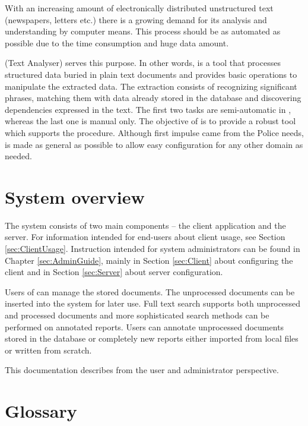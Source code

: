 
With an increasing amount of electronically distributed unstructured text
(newspapers, letters etc.) there is a growing demand for its analysis and
understanding by computer means. This process should be as automated as possible
due to the time consumption and huge data amount.

\textan{} (Text Analyser) serves this purpose. In other words, \textan{} is a
tool that processes structured data buried in plain text documents and provides
basic operations to manipulate the extracted data. The extraction consists of
recognizing significant phrases, matching them with data already stored in the
database and discovering dependencies expressed in the text. The first two tasks
are semi-automatic in \textan{}, whereas the last one is manual only. The
objective of \textan{} is to provide a robust tool which supports the procedure.
Although first impulse came from the Police needs, \textan{} is made as general as
possible to allow easy configuration for any other domain as needed.

\section{System overview}
The system consists of two main components -- the client application
and the server. For information intended for end-users about client usage, see
Section \ref{sec:ClientUsage}. Instruction intended for system
administrators can be found in Chapter \ref{sec:AdminGuide}, mainly in Section
\ref{sec:Client} about configuring the client and in Section \ref{sec:Server}
about server configuration.

Users of \textan{} can manage the stored documents. The unprocessed documents
can be inserted into the system for later use. Full text search supports both
unprocessed and processed documents and more sophisticated search methods can be
performed on annotated reports. Users can annotate unprocessed documents stored
in the database or completely new reports either imported from local files or
written from scratch.

This documentation describes \textan{} from the user and administrator
perspective.

\section{Glossary}

